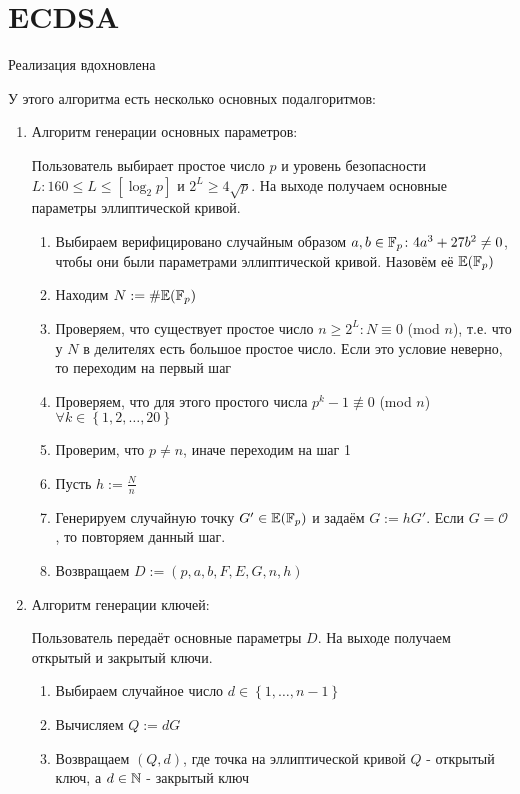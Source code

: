 
\section{ECDSA}
Реализация вдохновлена \cite{das2004guideprotocols}

У этого алгоритма есть несколько основных подалгоритмов:
    \begin{enumerate}
      \item Алгоритм генерации основных параметров: 

      Пользователь выбирает простое число $p$ и уровень безопасности $L\colon 160\leqslant L\leqslant [\log_2 p]$ и $2^L\geqslant 4 \sqrt{p}$. На выходе получаем основные параметры эллиптической кривой.

      \begin{enumerate}
        \item Выбираем верифицировано случайным образом $a,b\in \mathbb F_p\colon 4a^3+27b^2\neq 0$, чтобы они были параметрами эллиптической кривой. Назовём её $\mathbb E(\mathbb F_p)$
        \item Находим $N:=\#\mathbb E(\mathbb F_p)$
        \item Проверяем, что существует простое число $n\geqslant 2^L\colon N \equiv 0$ (mod $n$), т.е. что у $N$ в делителях есть большое простое число. Если это условие неверно, то переходим на первый шаг
        \item Проверяем, что для этого простого числа $p^k-1\not\equiv 0$ (mod $n$) $\forall k\in \left\{1,2,\dots,20\right\}$
        \item Проверим, что $p\neq n$, иначе переходим на шаг 1
        \item Пусть $h:=\frac{N}{n}$
        \item Генерируем случайную точку $G'\in \mathbb E(\mathbb F_p)$ и задаём $G:=hG'$. Если $G=\mathcal{O}$, то повторяем данный шаг.
        \item Возвращаем $D:=(p, a, b, F, E, G, n, h)$
      \end{enumerate}
      \item Алгоритм генерации ключей:

      Пользователь передаёт основные параметры $D$. На выходе получаем открытый и закрытый ключи.

      \begin{enumerate}
        \item Выбираем случайное число $d\in \left\{1,\dots,n-1\right\}$
        \item Вычисляем $Q:=dG$
        \item Возвращаем $(Q,d)$, где точка на эллиптической кривой $Q$ - открытый ключ, а $d\in\mathbb N$ - закрытый ключ
      \end{enumerate}


\end{enumerate}
